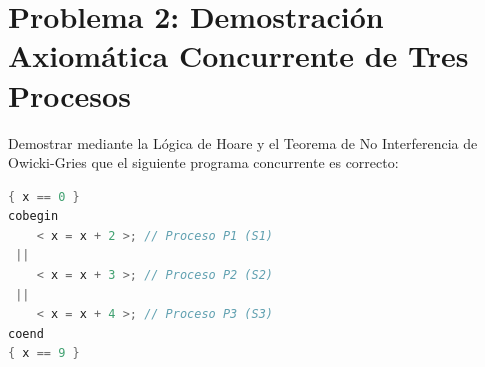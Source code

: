 \documentclass[11pt,a4paper,twoside,openright]{report}
\begin{document}
\newpage

\section{Problema 2: Demostración Axiomática Concurrente de Tres Procesos}

\begin{ejercicio}
Demostrar mediante la Lógica de Hoare y el Teorema de No Interferencia de Owicki-Gries que el siguiente programa concurrente es correcto:
\begin{lstlisting}[language=C++]
{ x == 0 }
cobegin
    < x = x + 2 >; // Proceso P1 (S1)
 ||
    < x = x + 3 >; // Proceso P2 (S2)
 ||
    < x = x + 4 >; // Proceso P3 (S3)
coend
{ x == 9 }
\end{lstlisting}
\end{ejercicio}
\end{document}
